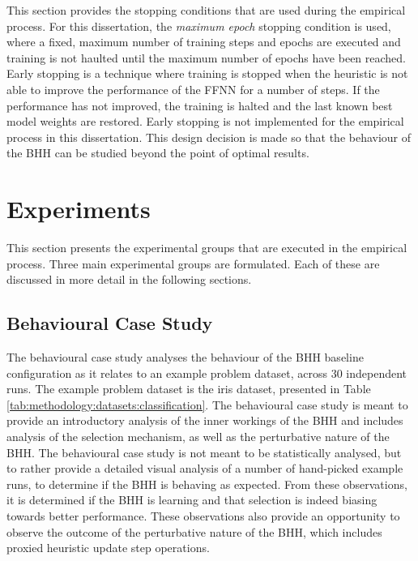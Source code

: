 This section provides the stopping conditions that are used during the empirical process. For this dissertation, the \textit{maximum epoch} stopping condition is used, where a fixed, maximum number of training steps and epochs are executed and training is not haulted until the maximum number of epochs have been reached. Early stopping is a technique where training is stopped when the heuristic is not able to improve the performance of the \acs{FFNN} for a number of steps. If the performance has not improved, the training is halted and the last known best model weights are restored. Early stopping is not implemented for the empirical process in this dissertation. This design decision is made so that the behaviour of the \acs{BHH} can be studied beyond the point of optimal results.


\section{Experiments}
\label{sec:methodology:experiments}

This section presents the experimental groups that are executed in the empirical process. Three main experimental groups are formulated. Each of these are discussed in more detail in the following sections.


\subsection{Behavioural Case Study}
\label{sec:methodology:experiments:case_study}

The behavioural case study analyses the behaviour of the \acs{BHH} baseline configuration as it relates to an example problem dataset, across 30 independent runs. The example problem dataset is the iris dataset, presented in Table \ref{tab:methodology:datasets:classification}. The behavioural case study is meant to provide an introductory analysis of the inner workings of the \acs{BHH} and includes analysis of the selection mechanism, as well as the perturbative nature of the \acs{BHH}. The behavioural case study is not meant to be statistically analysed, but to rather provide a detailed visual analysis of a number of hand-picked example runs, to determine if the \acs{BHH} is behaving as expected. From these observations, it is determined if the \acs{BHH} is learning and that selection is indeed biasing towards better performance. These observations also provide an opportunity to observe the outcome of the perturbative nature of the \acs{BHH}, which includes proxied heuristic update step operations.


